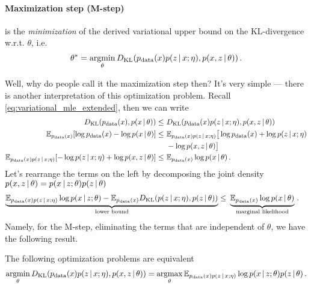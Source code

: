 \paragraph{Maximization step (M-step)} is the \textit{minimization} of the derived variational upper bound on the KL-divergence w.r.t. $\theta$, i.e.
\begin{align}
    \theta^* = \operatorname*{argmin}_\theta D_{\mathrm{KL}}(p_{\text{data}}(x)p(z\,|\, x;\eta), p(x,z\,|\, \theta))\,.
\end{align}

Well, why do people call it the maximization step then? It's very simple --- there is another interpretation of this optimization problem.
Recall \cref{eq:variational_mle_extended}, then we can write 
\begin{align}
    \KL(p_{\text{data}}(x), p(x\cond \theta)) \leq~& \KL(p_{\text{data}}(x)p(z\cond x;\eta), p(x,z\cond \theta))\\
    \mean_{p_{\text{data}}(x)}\left[\log p_{\text{data}}(x) - \log p(x\cond \theta)\right] \leq~& \mean_{p_{\text{data}}(x)p(z\cond x;\eta)}\big[\log p_{\text{data}}(x) + \log p(z\cond x;\eta) \\
    ~&- \log p(x,z\cond \theta)\big]\\
     \mean_{p_{\text{data}}(x)p(z\cond x;\eta)}\left[-\log p(z\cond x;\eta) + \log p(x,z\cond \theta)\right]\leq~& \mean_{p_{\text{data}}(x)}\log p(x\cond \theta)\,.
\end{align}
Let's rearrange the terms on the left by decomposing the joint density $p(x,z\,|\, \theta) = p(x\,|\, z;\theta)p(z\,|\, \theta)$
\begin{align}
    \underbrace{\mathbb{E}_{p_{\text{data}}(x)p(z\,|\, x;\eta)}\log p(x\,|\, z;\theta) - \mathbb{E}_{p_{\text{data}}(x)}D_{\mathrm{KL}}(p(z\,|\, x;\eta),p(z\,|\,\theta))}_{\text{lower bound}}\leq~& \underbrace{\mathbb{E}_{p_{\text{data}}(x)}\log p(x\,|\, \theta)}_{\text{marginal likelihood}}\,.
\end{align}
Namely, for the M-step, eliminating the terms that are independent of $\theta$, we have the following result.
\begin{proposition}[M-step]
The following optimization problems are equivalent
    \begin{align}
        \operatorname*{argmin}_\theta D_{\mathrm{KL}}(p_{\text{data}}(x)p(z\,|\, x;\eta), p(x,z\,|\, \theta)) = \operatorname*{argmax}_\theta \mathbb{E}_{p_{\text{data}}(x)p(z\,|\, x;\eta)}\log p(x\,|\, z;\theta)p(z\,|\,\theta)\,.
    \end{align}
\end{proposition}

